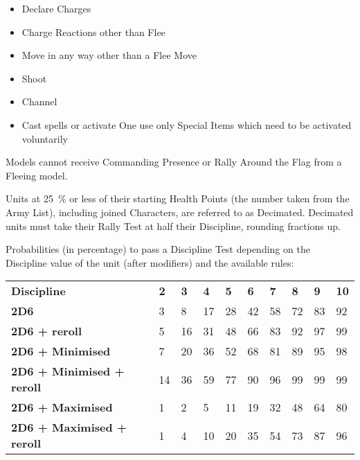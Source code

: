 \documentclass[a4paper,10pt]{article}
\begin{document}
\begin{minipage}[t]{0.485\textwidth}
\begin{itemize}[itemsep=0pt]
\item Declare Charges
\item Charge Reactions other than Flee
\item Move in any way other than a Flee Move
\item Shoot
\item Channel
\item Cast spells or activate One use only Special Items which need to be activated voluntarily
\end{itemize}

Models cannot receive Commanding Presence or Rally Around the Flag from a Fleeing model.


Units at \SI{25}{\percent} or less of their starting Health Points (the number taken from the Army List), including joined Characters, are referred to as Decimated. Decimated units must take their Rally Test at half their Discipline, rounding fractions up.

\end{minipage}

\separator\vspace*{-10pt}



Probabilities (in percentage) to pass a Discipline Test depending on the Discipline value of the unit (after modifiers) and the available rules:

{
\begin{center}
\setlength{\tabcolsep}{3pt}
\alternaterowcolors\begin{tabular}{M{4.5cm}*{9}{M{0.58cm}}}
\hline
\textbf{Discipline} & \textbf{2} & \textbf{3} & \textbf{4} & \textbf{5} & \textbf{6} & \textbf{7} & \textbf{8} & \textbf{9} & \textbf{10} \\
\textbf{2D6} & \num{3} & \num{8} & \num{17} & \num{28} & \num{42} & \num{58} & \num{72} & \num{83} & \num{92} \\
\textbf{2D6 + reroll} & \num{5} & \num{16} & \num{31} & \num{48} & \num{66} & \num{83} & \num{92} & \num{97} & \num{99} \\
\textbf{2D6 + Minimised} & \num{7} & \num{20} & \num{36} & \num{52} & \num{68} & \num{81} & \num{89} & \num{95} & \num{98} \\
\textbf{2D6 + Minimised + reroll} & \num{14} & \num{36} & \num{59} & \num{77} & \num{90} & \num{96} & \num{99} & \num{99} & \num{99} \\
\textbf{2D6 + Maximised} & \num{1} & \num{2} & \num{5} & \num{11} & \num{19} & \num{32} & \num{48} & \num{64} & \num{80} \\
\textbf{2D6 + Maximised + reroll} & \num{1} & \num{4} & \num{10} & \num{20} & \num{35} & \num{54} & \num{73} & \num{87} & \num{96} \\
\hline
\end{tabular}
\end{center}
}
\end{document}
